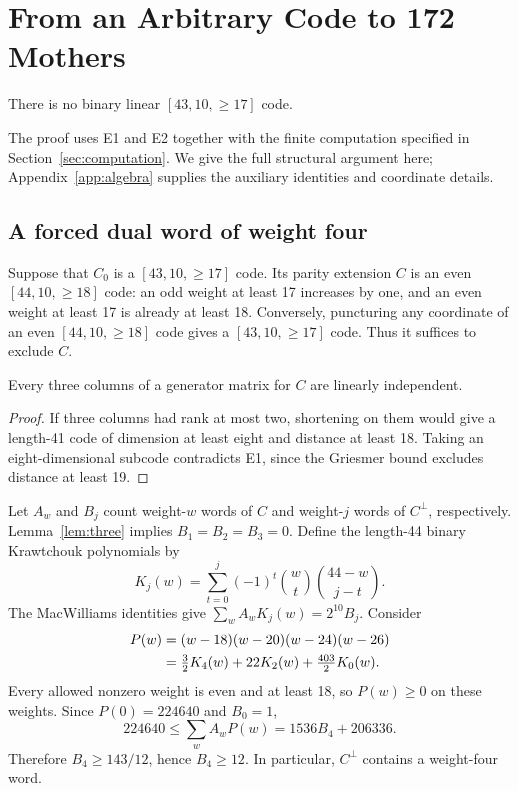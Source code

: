 \section{From an Arbitrary Code to 172 Mothers}
\label{sec:reduction}
\begin{theorem}\label{thm:main}
There is no binary linear $[43,10,\ge17]$ code.
\end{theorem}
The proof uses E1 and E2 together with the finite computation specified in Section~\ref{sec:computation}. We give the full structural argument here; Appendix~\ref{app:algebra} supplies the auxiliary identities and coordinate details.

\subsection{A forced dual word of weight four}
Suppose that $C_0$ is a $[43,10,\ge17]$ code. Its parity extension $C$ is an even $[44,10,\ge18]$ code: an odd weight at least 17 increases by one, and an even weight at least 17 is already at least 18. Conversely, puncturing any coordinate of an even $[44,10,\ge18]$ code gives a $[43,10,\ge17]$ code. Thus it suffices to exclude $C$.

\begin{lemma}\label{lem:three}
Every three columns of a generator matrix for $C$ are linearly independent.
\end{lemma}
\begin{proof}
If three columns had rank at most two, shortening on them would give a length-41 code of dimension at least eight and distance at least 18. Taking an eight-dimensional subcode contradicts E1, since the Griesmer bound excludes distance at least 19.
\end{proof}
Let $A_w$ and $B_j$ count weight-$w$ words of $C$ and weight-$j$ words of $C^\perp$, respectively. Lemma~\ref{lem:three} implies $B_1=B_2=B_3=0$. Define the length-44 binary Krawtchouk polynomials by
\[
 K_j(w)=\sum_{t=0}^j(-1)^t\binom wt\binom{44-w}{j-t}.
\]
The MacWilliams identities give $\sum_w A_w K_j(w)=2^{10}B_j$. Consider
\begin{align}
 P(w)&=(w-18)(w-20)(w-24)(w-26)\notag\\
 &=\tfrac32K_4(w)+22K_2(w)+\tfrac{403}{2}K_0(w).
 \label{eq:polynomial}
\end{align}
Every allowed nonzero weight is even and at least 18, so $P(w)\ge0$ on these weights. Since $P(0)=224640$ and $B_0=1$,
\[
 224640\le\sum_w A_wP(w)=1536B_4+206336.
\]
Therefore $B_4\ge143/12$, hence $B_4\ge12$. In particular, $C^\perp$ contains a weight-four word.

